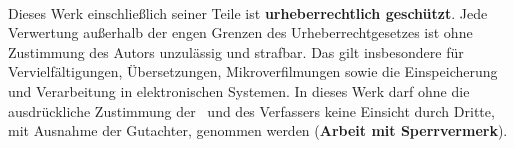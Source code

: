 \begin{titlepage}
\begin{center}
        \textcopyright\ \Cyear\\[1.5ex]
    \end{center}
    
    \singlespacing
    \small
    \noindent Dieses Werk einschließlich seiner Teile ist \textbf{urheberrechtlich geschützt}. Jede Verwertung außerhalb der engen Grenzen des Urheberrechtgesetzes ist ohne Zustimmung des Autors unzulässig und strafbar. Das gilt insbesondere für Vervielfältigungen, Übersetzungen, Mikroverfilmungen sowie die Einspeicherung und Verarbeitung in elektronischen Systemen. In dieses Werk darf ohne die ausdrückliche Zustimmung der \Ccompanyname\ und des Verfassers keine Einsicht durch Dritte, mit Ausnahme der Gutachter, genommen werden (\textbf{Arbeit mit Sperrvermerk}).
    
\end{titlepage}
